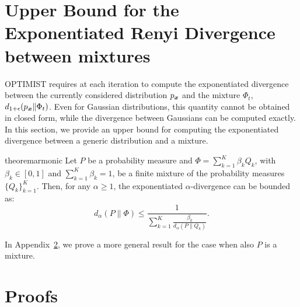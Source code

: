 \documentclass{article}
\makeatletter
\DeclareRobustCommand{\algoname}{OPTIMIST\@\xspace}
\makeatother
\begin{document}




\clearpage
\onecolumn
\appendix

\section{Upper Bound for the Exponentiated Renyi Divergence between mixtures}\label{app:practical}
\algoname requires at each iteration to compute the exponentiated \Renyi divergence between the currently considered distribution $p_{\boldsymbol{x}}$ 
and the mixture $\Phi_t$, \ie $d_{1+\epsilon}(p_{\boldsymbol{x}}\|\Phi_t)$. Even for Gaussian distributions, this quantity cannot be obtained in closed form, while
the \Renyi divergence between Gaussians can be computed exactly. In this section, we provide an upper bound for computing the exponentiated \Renyi divergence
between a generic distribution and a mixture.
\begin{restatable}{theorem}{armonic}\label{th:armonic}
	Let $P$ be a probability measure and $\Phi = \sum_{k=1}^K \beta_k Q_k$, with $\beta_k \in [0,1]$ and $\sum_{k=1}^K \beta_k =1$, be a finite mixture of the
	probability measures $\{Q_k\}_{k=1}^K$. Then, for any $\alpha \ge 1$, the exponentiated $\alpha$-\Renyi divergence can be bounded as: 
	\begin{equation*}
	d_{\alpha}(P \| \Phi) \le \frac{1} {\sum_{k=1}^K \frac{ \beta_k}{ d_{\alpha}(P \| Q_k)}}.
	\end{equation*}
\end{restatable}

In Appendix~\ref{app:proof}, we prove a more general result for the case when also $P$ is a mixture.

\section{Proofs}\label{app:proof}
\end{document}

